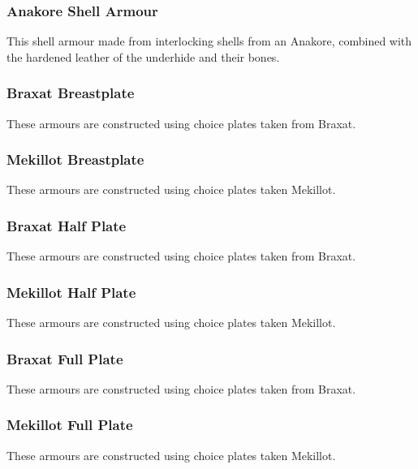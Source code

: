 \begin{multicols}{2}
\subsubsection{Anakore Shell Armour}
\label{itmamr:anakoreshell}
This shell armour made from interlocking shells from an Anakore, combined with the hardened leather of the underhide and their bones.


\subsubsection{Braxat Breastplate}
\label{itmamr:braxatbreastplate}
These armours are constructed using choice plates taken from Braxat.

\subsubsection{Mekillot Breastplate}
\label{itmamr:mekillotbreastplate}
These armours are constructed using choice plates taken Mekillot.

\subsubsection{Braxat Half Plate}
\label{itmamr:braxathalfplate}
These armours are constructed using choice plates taken from Braxat.

\subsubsection{Mekillot Half Plate}
\label{itmamr:mekillothalfplate}
These armours are constructed using choice plates taken Mekillot.

\subsubsection{Braxat Full Plate}
\label{itmamr:braxatfullplate}
These armours are constructed using choice plates taken from Braxat.

\subsubsection{Mekillot Full Plate}
\label{itmamr:mekillotfullplate}
These armours are constructed using choice plates taken Mekillot.

\end{multicols}

